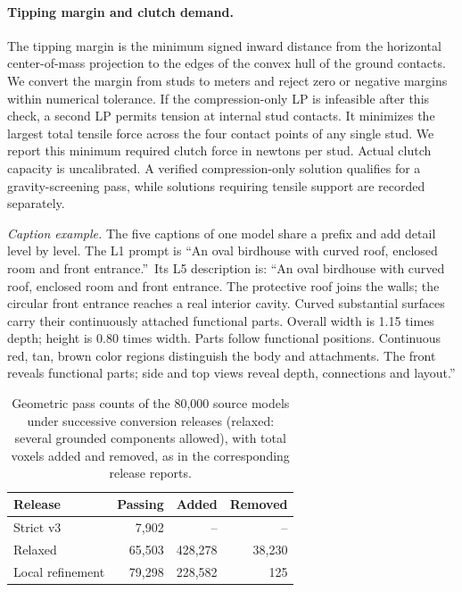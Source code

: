\documentclass[letterpaper]{article} %
\begin{document}
\paragraph{Tipping margin and clutch demand.}
The tipping margin is the minimum signed inward distance from the horizontal center-of-mass projection to the edges of the convex hull of the ground contacts. We convert the margin from studs to meters and reject zero or negative margins within numerical tolerance. If the compression-only LP is infeasible after this check, a second LP permits tension at internal stud contacts. It minimizes the largest total tensile force across the four contact points of any single stud. We report this minimum required clutch force in newtons per stud. Actual clutch capacity is uncalibrated. A verified compression-only solution qualifies for a gravity-screening pass, while solutions requiring tensile support are recorded separately.

\emph{Caption example.} The five captions of one model share a prefix and add detail level by level. The L1 prompt is \textquotedblleft An oval birdhouse with curved roof, enclosed room and front entrance.\textquotedblright\ Its L5 description is: ``An oval birdhouse with curved roof, enclosed room and front entrance. The protective roof joins the walls; the circular front entrance reaches a real interior cavity. Curved substantial surfaces carry their continuously attached functional parts. Overall width is 1.15 times depth; height is 0.80 times width. Parts follow functional positions. Continuous red, tan, brown color regions distinguish the body and attachments. The front reveals functional parts; side and top views reveal depth, connections and layout.''

\begin{table}[!htbp]
\centering
\small
\setlength{\tabcolsep}{3pt}
\begin{tabular}{lrrr}
\toprule
Release & Passing & Added & Removed \\
\midrule
Strict v3 & 7,902 & -- & -- \\
Relaxed & 65,503 & 428,278 & 38,230 \\
Local refinement & 79,298 & 228,582 & 125 \\ %
\bottomrule
\end{tabular}
\caption{Geometric pass counts of the 80,000 source models under successive conversion releases (relaxed: several grounded components allowed), with total voxels added and removed, as in the corresponding release reports.}
\label{tab:conversion}
\end{table}
\end{document}
